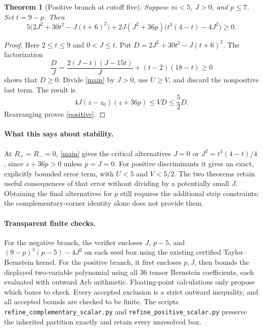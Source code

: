 \documentclass[11pt]{article}
\newtheorem{theorem}{Theorem}
\begin{document}
\begin{theorem}[Positive branch at cutoff five]
Suppose $m<5$, $J>0$, and $p\le7$. Set $t=9-p$. Then
\begin{equation}\label{positive}
 \boxed{\quad
 5\bigl(2J^2+30t^2-J(t+6)^2\bigr)
 +2J(J^2+36p)\bigl(t^3(4-t)-4J^2\bigr)\ge0.
 \quad}
\end{equation}
\end{theorem}
\begin{proof}
Here $2\le t\le9$ and $0<J\le t$. Put
$D=2J^2+30t^2-J(t+6)^2$. The factorization
\[
 \frac D J
 =\frac{2(J-t)(J-15t)}J+(t-2)(18-t)\ge0
\]
shows that $D\ge0$. Divide \eqref{main} by $J>0$, use $U\ge V$,
and discard the nonpositive last term. The result is
\[
 4J(z-z_0)(z+36p)\le VD\le\frac52D.
\]
Rearranging proves \eqref{positive}.
\end{proof}

\paragraph{What this says about stability.}
At $R_+=R_-=0$, \eqref{main} gives the critical alternatives
$J=0$ or $J^2=t^3(4-t)/4$, since $z+36p>0$ unless $p=J=0$.
For positive discriminants it gives an exact, explicitly bounded error
term, with $U<5$ and $V<5/2$. The two theorems retain useful consequences
of that error without dividing by a potentially small $J$.
Obtaining the final alternatives for $p$ still requires the additional
strip constraints; the complementary-corner identity alone does not
provide them.

\paragraph{Transparent finite checks.}
For the negative branch, the verifier encloses $J$, $p-5$, and
$(9-p)^3(p-5)-4J^2$ on each seed box using the existing certified
Taylor--Bernstein kernel. For the positive branch, it first encloses $p,J$,
then bounds the displayed two-variable polynomial using all 36 tensor
Bernstein coefficients, each evaluated with outward Arb arithmetic.
Floating-point calculations only propose which boxes to check.
Every accepted exclusion is a strict outward inequality, and all accepted
bounds are checked to be finite. The scripts
\texttt{refine\_complementary\_scalar.py} and
\texttt{refine\_positive\_scalar.py} preserve the inherited partition
exactly and retain every unresolved box.
\end{document}
